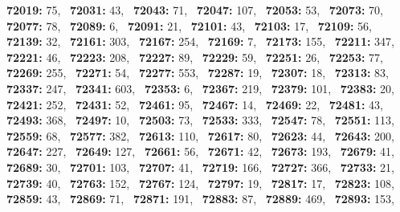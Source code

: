 \textbf{72019:} 75,\allowbreak~ 
\textbf{72031:} 43,\allowbreak~ 
\textbf{72043:} 71,\allowbreak~ 
\textbf{72047:} 107,\allowbreak~ 
\textbf{72053:} 53,\allowbreak~ 
\textbf{72073:} 70,\allowbreak~ 
\textbf{72077:} 78,\allowbreak~ 
\textbf{72089:} 6,\allowbreak~ 
\textbf{72091:} 21,\allowbreak~ 
\textbf{72101:} 43,\allowbreak~ 
\textbf{72103:} 17,\allowbreak~ 
\textbf{72109:} 56,\allowbreak~ 
\textbf{72139:} 32,\allowbreak~ 
\textbf{72161:} 303,\allowbreak~ 
\textbf{72167:} 254,\allowbreak~ 
\textbf{72169:} 7,\allowbreak~ 
\textbf{72173:} 155,\allowbreak~ 
\textbf{72211:} 347,\allowbreak~ 
\textbf{72221:} 46,\allowbreak~ 
\textbf{72223:} 208,\allowbreak~ 
\textbf{72227:} 89,\allowbreak~ 
\textbf{72229:} 59,\allowbreak~ 
\textbf{72251:} 26,\allowbreak~ 
\textbf{72253:} 77,\allowbreak~ 
\textbf{72269:} 255,\allowbreak~ 
\textbf{72271:} 54,\allowbreak~ 
\textbf{72277:} 553,\allowbreak~ 
\textbf{72287:} 19,\allowbreak~ 
\textbf{72307:} 18,\allowbreak~ 
\textbf{72313:} 83,\allowbreak~ 
\textbf{72337:} 247,\allowbreak~ 
\textbf{72341:} 603,\allowbreak~ 
\textbf{72353:} 6,\allowbreak~ 
\textbf{72367:} 219,\allowbreak~ 
\textbf{72379:} 101,\allowbreak~ 
\textbf{72383:} 20,\allowbreak~ 
\textbf{72421:} 252,\allowbreak~ 
\textbf{72431:} 52,\allowbreak~ 
\textbf{72461:} 95,\allowbreak~ 
\textbf{72467:} 14,\allowbreak~ 
\textbf{72469:} 22,\allowbreak~ 
\textbf{72481:} 43,\allowbreak~ 
\textbf{72493:} 368,\allowbreak~ 
\textbf{72497:} 10,\allowbreak~ 
\textbf{72503:} 73,\allowbreak~ 
\textbf{72533:} 333,\allowbreak~ 
\textbf{72547:} 78,\allowbreak~ 
\textbf{72551:} 113,\allowbreak~ 
\textbf{72559:} 68,\allowbreak~ 
\textbf{72577:} 382,\allowbreak~ 
\textbf{72613:} 110,\allowbreak~ 
\textbf{72617:} 80,\allowbreak~ 
\textbf{72623:} 44,\allowbreak~ 
\textbf{72643:} 200,\allowbreak~ 
\textbf{72647:} 227,\allowbreak~ 
\textbf{72649:} 127,\allowbreak~ 
\textbf{72661:} 56,\allowbreak~ 
\textbf{72671:} 42,\allowbreak~ 
\textbf{72673:} 193,\allowbreak~ 
\textbf{72679:} 41,\allowbreak~ 
\textbf{72689:} 30,\allowbreak~ 
\textbf{72701:} 103,\allowbreak~ 
\textbf{72707:} 41,\allowbreak~ 
\textbf{72719:} 166,\allowbreak~ 
\textbf{72727:} 366,\allowbreak~ 
\textbf{72733:} 21,\allowbreak~ 
\textbf{72739:} 40,\allowbreak~ 
\textbf{72763:} 152,\allowbreak~ 
\textbf{72767:} 124,\allowbreak~ 
\textbf{72797:} 19,\allowbreak~ 
\textbf{72817:} 17,\allowbreak~ 
\textbf{72823:} 108,\allowbreak~ 
\textbf{72859:} 43,\allowbreak~ 
\textbf{72869:} 71,\allowbreak~ 
\textbf{72871:} 191,\allowbreak~ 
\textbf{72883:} 87,\allowbreak~ 
\textbf{72889:} 469,\allowbreak~ 
\textbf{72893:} 153,\allowbreak~ 
